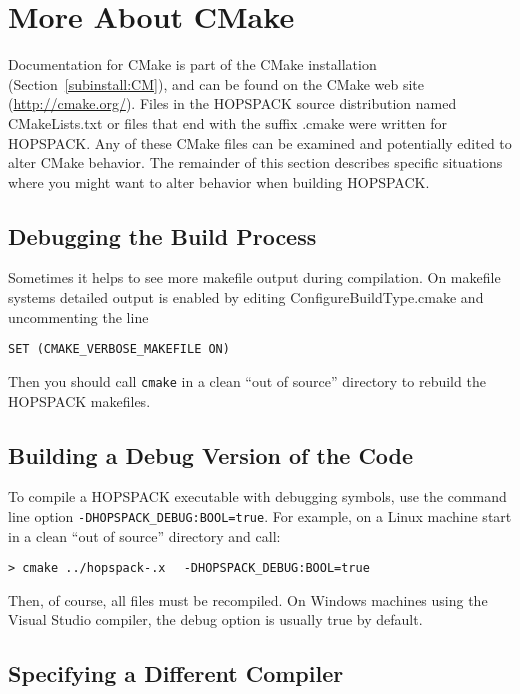 \clearpage
\section{More About CMake}
\label{sec:cmake}

Documentation for CMake is part of the CMake installation
(Section~\ref{subinstall:CM}), and can be found on the CMake web site
(\href{http://cmake.org/}{http://cmake.org/}).
Files in the HOPSPACK source distribution named {\sf CMakeLists.txt} or files
that end with the suffix {\sf .cmake} were written for HOPSPACK.
Any of these CMake files can be examined and potentially edited to alter
CMake behavior.  The remainder of this section describes specific situations
where you might want to alter behavior when building HOPSPACK.


\subsection{Debugging the Build Process}

Sometimes it helps to see more makefile output during compilation.
On makefile systems detailed output is enabled by editing
{\sf ConfigureBuildType.cmake} and uncommenting the line

\hspace{0.2in}
{\tt SET (CMAKE\_VERBOSE\_MAKEFILE ON)}

\noindent
Then you should call {\tt cmake} in a clean ``out of source'' directory to
rebuild the HOPSPACK makefiles.


\subsection{Building a Debug Version of the Code}

To compile a HOPSPACK executable with debugging symbols, use the command line
option {\tt -DHOPSPACK\_DEBUG:BOOL=true}.  For example, on a Linux machine
start in a clean ``out of source'' directory and call:

\hspace{0.2in}
{\tt > cmake ../hopspack-\HOPSVER.x $\;$ -DHOPSPACK\_DEBUG:BOOL=true}

\noindent
Then, of course, all files must be recompiled.
On Windows machines using the Visual Studio compiler, the debug option is
usually true by default.


\subsection{Specifying a Different Compiler}

